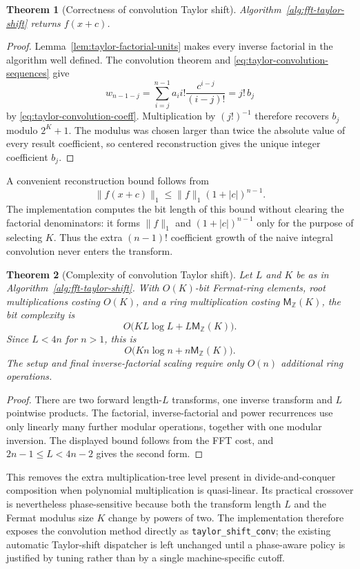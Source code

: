 \documentclass[11pt]{book}
\newtheorem{theorem}{Theorem}[section]
\theoremstyle{definition}
\newcommand{\ZZ}{\mathbb Z}
\newcommand{\MZ}{\mathsf M_{\ZZ}}
\begin{document}
\begin{theorem}[Correctness of convolution Taylor shift]
\label{thm:fft-taylor-shift}
Algorithm~\ref{alg:fft-taylor-shift} returns $f(x+c)$.
\end{theorem}

\begin{proof}
Lemma~\ref{lem:taylor-factorial-units} makes every inverse factorial in the
algorithm well defined.  The convolution theorem and
\eqref{eq:taylor-convolution-sequences} give
\[
 w_{n-1-j}
 =\sum_{i=j}^{n-1}a_i i!\frac{c^{i-j}}{(i-j)!}
 =j!\,b_j
\]
by \eqref{eq:taylor-convolution-coeff}.  Multiplication by $(j!)^{-1}$
therefore recovers $b_j$ modulo $2^K+1$.  The modulus was chosen larger than
twice the absolute value of every result coefficient, so centered
reconstruction gives the unique integer coefficient $b_j$.
\end{proof}

A convenient reconstruction bound follows from
\[
 \|f(x+c)\|_1\leq\|f\|_1(1+|c|)^{n-1}.
\]
The implementation computes the bit length of this bound without clearing the
factorial denominators: it forms $\|f\|_1$ and $(1+|c|)^{n-1}$ only for the
purpose of selecting $K$.  Thus the extra $(n-1)!$ coefficient growth of the
naive integral convolution never enters the transform.

\begin{theorem}[Complexity of convolution Taylor shift]
\label{thm:fft-taylor-shift-complexity}
Let $L$ and $K$ be as in Algorithm~\ref{alg:fft-taylor-shift}.  With
$O(K)$-bit Fermat-ring elements, root multiplications costing $O(K)$, and a
ring multiplication costing $\MZ(K)$, the bit complexity is
\[
 O\bigl(KL\log L+L\MZ(K)\bigr).
\]
Since $L<4n$ for $n>1$, this is
\[
 O\bigl(Kn\log n+n\MZ(K)\bigr).
\]
The setup and final inverse-factorial scaling require only $O(n)$ additional
ring operations.
\end{theorem}

\begin{proof}
There are two forward length-$L$ transforms, one inverse transform and $L$
pointwise products.  The factorial, inverse-factorial and power recurrences
use only linearly many further modular operations, together with one modular
inversion.  The displayed bound follows from the FFT cost, and
$2n-1\leq L<4n-2$ gives the second form.
\end{proof}

This removes the extra multiplication-tree level present in divide-and-conquer
composition when polynomial multiplication is quasi-linear.  Its practical
crossover is nevertheless phase-sensitive because both the transform length
$L$ and the Fermat modulus size $K$ change by powers of two.  The implementation
therefore exposes the convolution method directly as
\texttt{taylor\_shift\_conv}; the existing automatic Taylor-shift dispatcher is
left unchanged until a phase-aware policy is justified by tuning rather than by
a single machine-specific cutoff.
\end{document}
